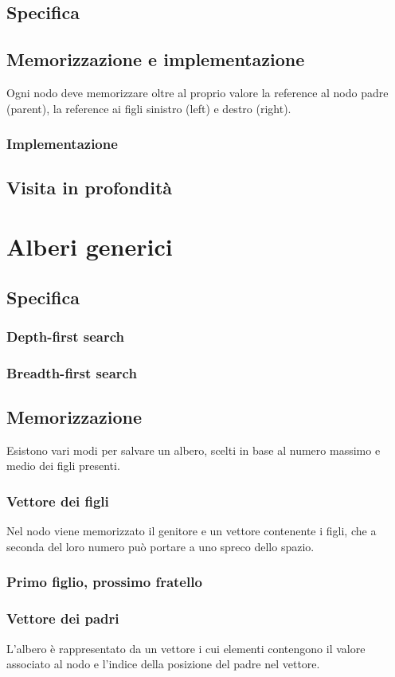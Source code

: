 \subsection{Specifica}

\subsection{Memorizzazione e implementazione}
Ogni nodo deve memorizzare oltre al proprio valore la reference al nodo padre (parent), la reference ai figli sinistro (left) e destro (right).
\subsubsection{Implementazione}

\subsection{Visita in profondit\`a}

\section{Alberi generici}
\subsection{Specifica}

\subsubsection{Depth-first search}

\subsubsection{Breadth-first search}

\subsection{Memorizzazione}
Esistono vari modi per salvare un albero, scelti in base al numero massimo e medio dei figli presenti.
\subsubsection{Vettore dei figli}
Nel nodo viene memorizzato il genitore e un vettore contenente i figli, che a seconda del loro numero pu\`o portare a uno spreco dello spazio.
\newpage
\subsubsection{Primo figlio, prossimo fratello}

\subsubsection{Vettore dei padri}
L'albero \`e rappresentato da un vettore i cui elementi contengono il valore associato al nodo e l'indice della posizione del padre nel vettore.
